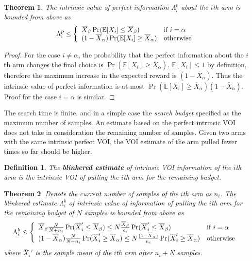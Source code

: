 \documentclass{article}
\newcommand {\IE} {\ensuremath {\mathbb{E}}}
\newtheorem{dfn}{Definition}
\newtheorem{thm}{Theorem}
\begin{document}
\begin{thm} The intrinsic value of perfect information $\Lambda_i^p$ about the $i$th arm is
  bounded from above as
\begin{equation}
  \Lambda_i^p \le \left\{
  \begin{array}{l l}
    \overline X_\beta \Pr(\IE[X_i] \le \overline X_\beta) & \mbox{if $i=\alpha$} \\
    (1-\overline X_\alpha)\Pr(\IE[X_i] \ge \overline X_\alpha) & \mbox{otherwise}
  \end{array} \right.
\label{eqn:thm-vopi}
\end{equation}
\label{thm:vopi}
\end{thm}

\begin{proof} For the case $i\ne \alpha$, the probability that the perfect
  information about the $i$th arm changes the final choice is
  $\Pr(\IE[X_i] \ge \overline X_\alpha)$. $\IE[X_i] \le 1$ by definition,
  therefore the maximum increase in the expected reward is
  $(1-\overline X_\alpha)$. Thus the intrinsic value of perfect
  information is at most $\Pr(\IE[X_i] \ge \overline
  X_\alpha)(1-\overline X_\alpha)$.
  Proof for the case $i=\alpha$ is similar.
\end{proof}

The search time is finite, and in a simple case the \textit{search
  budget} specified as the maximum number of samples.
An estimate based on the perfect intrinsic VOI does not take in
consideration the remaining number of samples. Given two arms
with the same intrinsic perfect VOI, the VOI
estimate of the arm pulled fewer times so far should be higher.

\begin{dfn} The \textbf{blinkered estimate} of intrinsic VOI information of the
  $i$th arm is the intrinsic VOI of pulling the $i$th arm for the
  remaining budget.
\end{dfn}

\begin{thm} Denote the current number of samples of the $i$th arm as
  $n_i$. The blinkered estimate $\Lambda_i^b$ of intrinsic value of
  information of pulling the $i$th arm for the remaining budget of $N$
  samples is bounded from above as
\begin{equation}
  \Lambda_i^b \le \left\{
  \begin{array}{l l}
    \overline X_\beta\frac N {N+n_i}\Pr(\overline X_i'\le\overline X_\beta)
    \le N\frac {\overline X_\beta} {n_i}\Pr(\overline X_i'\le\overline X_\beta) & \mbox{if $i=\alpha$} \\
    (1-\overline  X_\alpha)\frac N {N+n_i}\Pr(\overline X_i'\ge\overline X_\alpha)
       \le N\frac {(1-\overline  X_\alpha)} {n_i}\Pr(\overline X_i'\ge\overline X_\alpha) & \mbox{otherwise}
  \end{array} \right.
\label{eqn:thm-be}
\end{equation}
where $\overline X_i'$ is the sample mean of the $i$th arm after $n_i+N$ 
samples.
\label{thm:be}
\end{thm}
\end{document}
